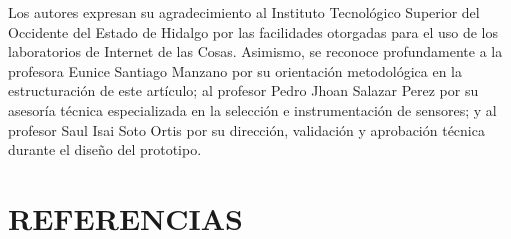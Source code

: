 \documentclass[twocolumn, 10pt]{article}
\begin{document}
Los autores expresan su agradecimiento al Instituto Tecnológico Superior del Occidente del Estado de Hidalgo por las facilidades otorgadas para el uso de los laboratorios de Internet de las Cosas. Asimismo, se reconoce profundamente a la profesora Eunice Santiago Manzano por su orientación metodológica en la estructuración de este artículo; al profesor Pedro Jhoan Salazar Perez por su asesoría técnica especializada en la selección e instrumentación de sensores; y al profesor Saul Isai Soto Ortis por su dirección, validación y aprobación técnica durante el diseño del prototipo.

\section*{REFERENCIAS}
\small
\end{document}
